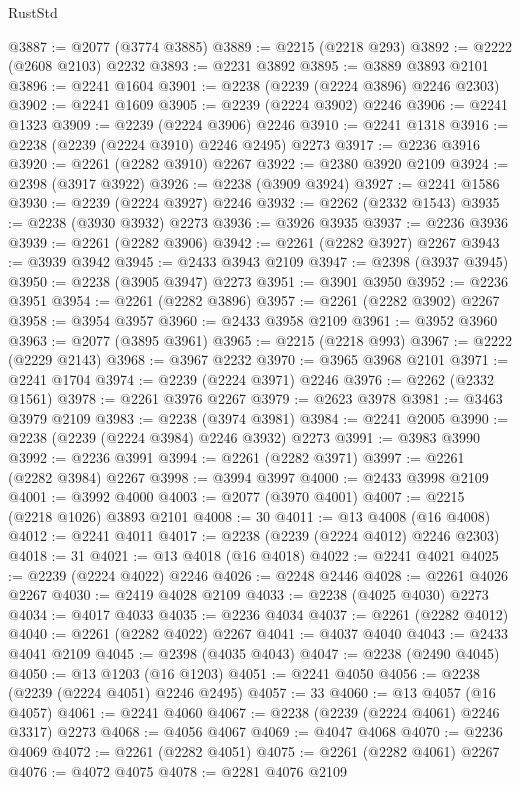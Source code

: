 \begin{lexlean}{RustStd}
\begin{coremodule}
@3887 := @2077 (@3774 @3885)
@3889 := @2215 (@2218 @293)
@3892 := @2222 (@2608 @2103) @2232
@3893 := @2231 @3892
@3895 := @3889 @3893 @2101
@3896 := @2241 @1604
@3901 := @2238 (@2239 (@2224 @3896) @2246 @2303)
@3902 := @2241 @1609
@3905 := @2239 (@2224 @3902) @2246
@3906 := @2241 @1323
@3909 := @2239 (@2224 @3906) @2246
@3910 := @2241 @1318
@3916 := @2238 (@2239 (@2224 @3910) @2246 @2495) @2273
@3917 := @2236 @3916
@3920 := @2261 (@2282 @3910) @2267
@3922 := @2380 @3920 @2109
@3924 := @2398 (@3917 @3922)
@3926 := @2238 (@3909 @3924)
@3927 := @2241 @1586
@3930 := @2239 (@2224 @3927) @2246
@3932 := @2262 (@2332 @1543)
@3935 := @2238 (@3930 @3932) @2273
@3936 := @3926 @3935
@3937 := @2236 @3936
@3939 := @2261 (@2282 @3906)
@3942 := @2261 (@2282 @3927) @2267
@3943 := @3939 @3942
@3945 := @2433 @3943 @2109
@3947 := @2398 (@3937 @3945)
@3950 := @2238 (@3905 @3947) @2273
@3951 := @3901 @3950
@3952 := @2236 @3951
@3954 := @2261 (@2282 @3896)
@3957 := @2261 (@2282 @3902) @2267
@3958 := @3954 @3957
@3960 := @2433 @3958 @2109
@3961 := @3952 @3960
@3963 := @2077 (@3895 @3961)
@3965 := @2215 (@2218 @993)
@3967 := @2222 (@2229 @2143)
@3968 := @3967 @2232
@3970 := @3965 @3968 @2101
@3971 := @2241 @1704
@3974 := @2239 (@2224 @3971) @2246
@3976 := @2262 (@2332 @1561)
@3978 := @2261 @3976 @2267
@3979 := @2623 @3978
@3981 := @3463 @3979 @2109
@3983 := @2238 (@3974 @3981)
@3984 := @2241 @2005
@3990 := @2238 (@2239 (@2224 @3984) @2246 @3932) @2273
@3991 := @3983 @3990
@3992 := @2236 @3991
@3994 := @2261 (@2282 @3971)
@3997 := @2261 (@2282 @3984) @2267
@3998 := @3994 @3997
@4000 := @2433 @3998 @2109
@4001 := @3992 @4000
@4003 := @2077 (@3970 @4001)
@4007 := @2215 (@2218 @1026) @3893 @2101
@4008 := 30
@4011 := @13 @4008 (@16 @4008)
@4012 := @2241 @4011
@4017 := @2238 (@2239 (@2224 @4012) @2246 @2303)
@4018 := 31
@4021 := @13 @4018 (@16 @4018)
@4022 := @2241 @4021
@4025 := @2239 (@2224 @4022) @2246
@4026 := @2248 @2446
@4028 := @2261 @4026 @2267
@4030 := @2419 @4028 @2109
@4033 := @2238 (@4025 @4030) @2273
@4034 := @4017 @4033
@4035 := @2236 @4034
@4037 := @2261 (@2282 @4012)
@4040 := @2261 (@2282 @4022) @2267
@4041 := @4037 @4040
@4043 := @2433 @4041 @2109
@4045 := @2398 (@4035 @4043)
@4047 := @2238 (@2490 @4045)
@4050 := @13 @1203 (@16 @1203)
@4051 := @2241 @4050
@4056 := @2238 (@2239 (@2224 @4051) @2246 @2495)
@4057 := 33
@4060 := @13 @4057 (@16 @4057)
@4061 := @2241 @4060
@4067 := @2238 (@2239 (@2224 @4061) @2246 @3317) @2273
@4068 := @4056 @4067
@4069 := @4047 @4068
@4070 := @2236 @4069
@4072 := @2261 (@2282 @4051)
@4075 := @2261 (@2282 @4061) @2267
@4076 := @4072 @4075
@4078 := @2281 @4076 @2109

\end{coremodule}
\end{lexlean}
